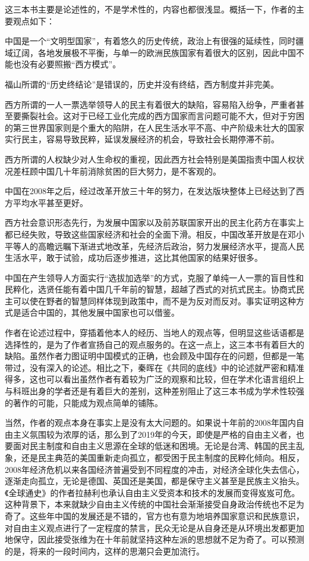 这三本书主要是论述性的，不是学术性的，内容也都很浅显。概括一下，作者的主要观点如下：
\begin{itemize*}
	\item 中国是一个“文明型国家”，有着悠久的历史传统，政治上有很强的延续性，同时疆域辽阔，各地发展极不平衡，与单一的欧洲民族国家有着很大的区别，因此中国不能也没有必要照搬“西方模式”。
	\item 福山所谓的“历史终结论”是错误的，历史并没有终结，西方制度并非完美。
	\item 西方所谓的一人一票选举领导人的民主有着很大的缺陷，容易陷入纷争，严重者甚至要撕裂社会。这对于已经工业化完成的西方国家而言问题可能不大，但对于穷困的第三世界国家则是个重大的陷阱，在人民生活水平不高、中产阶级未壮大的国家实行民主，容易导致民粹，延误发展经济的机会，导致社会长期停滞不前。
	\item 西方所谓的人权缺少对人生命权的重视，因此西方社会特别是美国指责中国人权状况差枉顾中国几十年前消除贫困的巨大努力，是不客观的。
	\item 中国在2008年之后，经过改革开放三十年的努力，在发达版块整体上已经达到了西方平均水平甚至更好。
	\item 西方社会意识形态先行，为发展中国家以及前苏联国家开出的民主化药方在事实上都已经失败，导致这些国家经济和社会的全面下滑。相反，中国改革开放是在邓小平等人的高瞻远瞩下渐进式地改革，先经济后政治，努力发展经济水平，提高人民生活水平，敢于试验，成功后逐步推进，这比其他国家的结果好很多。
	\item 中国在产生领导人方面实行“选拔加选举”的方式，克服了单纯一人一票的盲目性和民粹化，选贤任能有着中国几千年前的智慧，超越了西式的对抗式民主。协商式民主可以使在野者的智慧同样体现到政策中，而不是为反对而反对。事实证明这种方式是适合中国的，其他发展中国家也可以借鉴。
\end{itemize*}

作者在论述过程中，穿插着他本人的经历、当地人的观点等，但明显这些话语都是选择性的，是为了作者宣扬自己的观点服务的。在这一点上，这三本书有着巨大的缺陷。虽然作者力图证明中国模式的正确，也会顾及中国存在的问题，但都是一笔带过，没有深入的论述。相比之下，秦晖在《共同的底线》中的论述就严密和精准得多，这也可以看出虽然作者有着较为广泛的观察和比较，但在学术化语言组织上与科班出身的学者还是有着巨大的差别，这种差别阻止了这三本书成为学术性较强的著作的可能，只能成为观点简单的铺陈。

当然，作者的观点本身在事实上是没有太大问题的。如果说十年前的2008年国内自由主义氛围较为浓厚的话，那么到了2019年的今天，即使是严格的自由主义者，也要面对民主制度和自由主义思源在全球的低迷和困境。无论是台湾、韩国的民主乱象，还是民主典范的美国重新走向孤立，都受困于民主制度的民粹化倾向。相反，2008年经济危机以来各国经济普遍受到不同程度的冲击，对经济全球化失去信心，逐渐走向孤立，无论是德国、英国还是美国，都是保守主义甚至是民族主义抬头。《全球通史》的作者拉赫利也承认自由主义受资本和技术的发展而变得岌岌可危。这种背景下，本来就缺少自由主义传统的中国社会渐渐接受自身政治传统也不足为奇了。这些年中国的发展还是不错的，官方也有意为地培养国家意识和民族意识，对自由主义观点进行了一定程度的禁言，民众无论是从自身还是从环境出发都更加地保守，因此接受张维为在十年前就坚持这种左派的思想就不足为奇了。可以预测的是，将来的一段时间内，这样的思潮只会更加流行。

